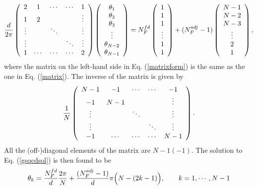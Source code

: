\documentclass[a4paper,12pt]{article}
\begin{document}
\begin{equation}
{d\over{2\pi}}\left(\begin{array}{ccccc}
2&1&\cdots&\cdots& 1\\
1&2& & &\vdots\\
\vdots& &\ddots & &\vdots\\
\vdots& & & \ddots&\vdots\\
1&\cdots&\cdots&\cdots&2\\
\end{array}\right)\left(\begin{array}{c}
\theta_1\\
\theta_2\\
\theta_3\\
\vdots\\
\theta_{N-2}\\
\theta_{N-1}
\end{array}\right)
=N_F^{fd}
\left(\begin{array}{c}
1\\
1\\
1\\
\vdots\\
1\\
1\end{array}\right)
+(N_F^{adj}-1)
\left(\begin{array}{c}
N-1\\
N-2\\
N-3\\
\vdots\\
2\\
1\end{array}\right),
\label{matrixform}
\end{equation}
where the matrix on the left-hand side in Eq. (\ref{matrixform}) 
is the same as the one in Eq. (\ref{matrix}).
The inverse of the matrix is given by
\begin{equation}
{1\over N}\left(\begin{array}{ccccc}
N-1&-1&\cdots&\cdots& -1\\
-1&N-1& & &\vdots\\
\vdots& &\ddots & &\vdots\\
\vdots& & & \ddots&\vdots\\
-1&\cdots&\cdots&\cdots&N-1\\
\end{array}\right).
\label{inverse}
\end{equation}
All the (off-)diagonal elements of the matrix 
are $N-1(-1)$. The solution to Eq. (\ref{gsqcdsol}) is then found to be 
\begin{equation}
\theta_k={{N_F^{fd}}\over d}{{2\pi}\over N}+{{(N_F^{adj}-1)}\over d}
\pi\Bigl(N-(2k-1)\Bigr),\qquad k=1,\cdots, N-1
\label{gsqcdsolb}
\end{equation}
\end{document}

